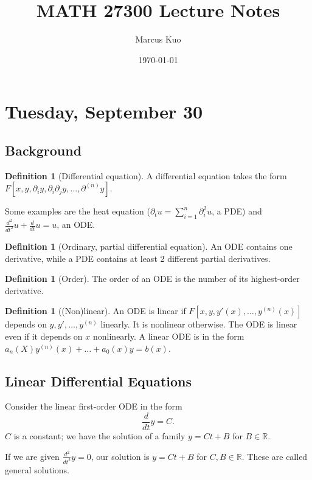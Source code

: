 \documentclass{tufte-handout}
\title{MATH 27300 Lecture Notes}
\author{Marcus Kuo}
\date{\today} %
\newcommand*\R{\mathbb{R}}
\theoremstyle{definition}
\newtheorem{defn}[thm]{Definition}
\begin{document}
\maketitle
\tableofcontents

\newpage

\section{Tuesday, September 30}\label{}
\subsection{Background}
\begin{defn}[Differential equation]
	A differential equation takes the form $F\left[ x,y, \partial_i y, \partial_i \partial_j y, \ldots, \partial^{(n)}y \right]$.
\end{defn}

Some examples are the heat equation ($\partial_t u = \sum\limits_{i=1}^{n} \partial^2_i u$, a PDE) and $\frac{d^2}{dt^2}u + \frac{d}{dt}u = u$, an ODE.

\begin{defn}[Ordinary, partial differential equation]
	An ODE contains one derivative, while a PDE contains at least 2 different partial derivatives.
\end{defn}

\begin{defn}[Order]
	The order of an ODE is the number of its highest-order derivative.
\end{defn}

\begin{defn}[(Non)linear]
	An ODE is linear if $F\left[ x,y,y'(x),\ldots,y^{(n)}(x) \right]$ depends on $y, y', \ldots, y^{(n)}$ linearly. It is nonlinear otherwise. The ODE is linear even if it depends on $x$ nonlinearly. 
	A linear ODE is in the form $a_n(X) y^{(n)} (x) + \ldots + a_0(x)y = b(x)$.
\end{defn}

\subsection{Linear Differential Equations}

Consider the linear first-order ODE in the form \[
	\frac{d}{dt}y = C
.\] $C$ is a constant; we have the solution of a family $y = Ct + B$ for $B \in \R$.

If we are given $\frac{d^2}{dt^2}y = 0$, our solution is $y = Ct + B$ for $C,B \in \R$. These are called general solutions.
\end{document}
